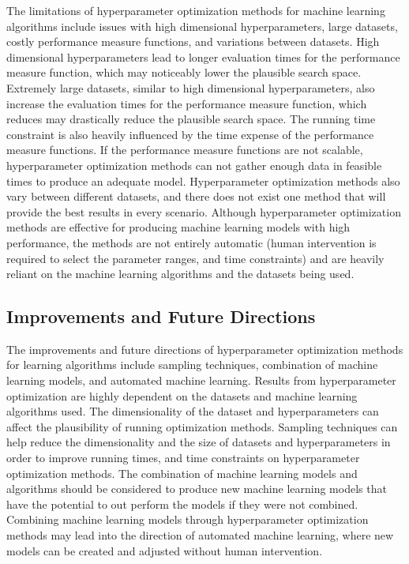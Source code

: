 The limitations of hyperparameter optimization methods for machine learning algorithms include issues with high dimensional hyperparameters, large datasets, costly performance measure functions, and variations between datasets. High dimensional hyperparameters lead to longer evaluation times for the performance measure function, which may noticeably  lower the plausible search space. Extremely large datasets, similar to high dimensional hyperparameters, also increase the evaluation times for the performance measure function, which reduces may drastically reduce the plausible search space. The running time constraint is also heavily influenced by the time expense of the performance measure functions. If the performance measure functions are not scalable, hyperparameter optimization methods can not gather enough data in feasible times to produce an adequate model. Hyperparameter optimization methods also vary between different datasets, and there does not exist one method that will provide the best results in every scenario. Although hyperparameter optimization methods are effective for producing machine learning models with high performance, the methods are not entirely automatic (human intervention is required to select the parameter ranges, and time constraints) and are heavily reliant on the machine learning algorithms and the datasets being used.


\subsection{Improvements and Future Directions} \label{improvements-and-future-directions}

The improvements and future directions of hyperparameter optimization methods for learning algorithms include sampling techniques, combination of machine learning models, and automated machine learning. Results from hyperparameter optimization are highly dependent on the datasets and machine learning algorithms used. The dimensionality of the dataset and hyperparameters can affect the plausibility of running optimization methods. Sampling techniques can help reduce the dimensionality and the size of datasets and hyperparameters in order to improve running times, and time constraints on hyperparameter optimization methods. The combination of machine learning models and algorithms should be considered to produce new machine learning models that have the potential to out perform the models if they were not combined. Combining machine learning models through hyperparameter optimization methods may lead into the direction of automated machine learning, where new models can be created and adjusted without human intervention.


